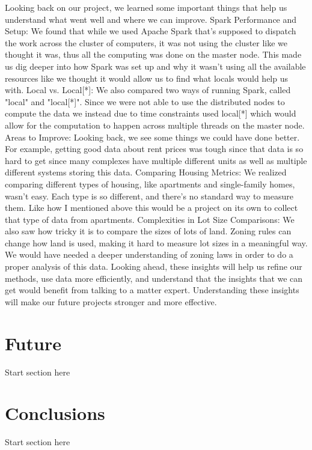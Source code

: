 \documentclass[titlepage]{article}
\begin{document}
Looking back on our project, we learned some important things that help us understand what went well and where we can improve. Spark Performance and Setup: We found that while we used Apache Spark that's supposed to dispatch the work across the cluster of computers, it was not using the cluster like we thought it was, thus all the computing was done on the master node. This made us dig deeper into how Spark was set up and why it wasn't using all the available resources like we thought it would allow us to find what locals would help us with. Local vs. Local[*]: We also compared two ways of running Spark, called "local" and "local[*]". Since we were not able to use the distributed nodes to compute the data we instead due to time constraints used local[*] which would allow for the computation to happen across multiple threads on the master node. Areas to Improve: Looking back, we see some things we could have done better. For example, getting good data about rent prices was tough since that data is so hard to get since many complexes have multiple different units as well as multiple different systems storing this data. Comparing Housing Metrics: We realized comparing different types of housing, like apartments and single-family homes, wasn't easy. Each type is so different, and there's no standard way to measure them. Like how I mentioned above this would be a project on its own to collect that type of data from apartments. Complexities in Lot Size Comparisons: We also saw how tricky it is to compare the sizes of lots of land. Zoning rules can change how land is used, making it hard to measure lot sizes in a meaningful way. We would have needed a deeper understanding of zoning laws in order to do a proper analysis of this data. Looking ahead, these insights will help us refine our methods, use data more efficiently, and understand that the insights that we can get would benefit from talking to a matter expert. Understanding these insights will make our future projects stronger and more effective.

\section{Future}
Start section here

\section{Conclusions}
Start section here



\end{document}
